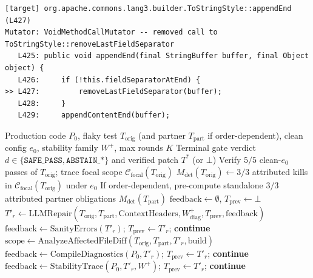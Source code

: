 \begin{lstlisting}[caption={Verbatim differential witness excerpt for Round~1 of \texttt{ToStringBuilderTest} (\texttt{split(",")}, 84/92 killed), exposing the masked trailing-separator fault and guiding Round~2 to \texttt{split(",", -1)} (92/92 killed).},label={lst:witness_example}]
[target] org.apache.commons.lang3.builder.ToStringStyle::appendEnd (L427)
Mutator: VoidMethodCallMutator -- removed call to ToStringStyle::removeLastFieldSeparator
   L425: public void appendEnd(final StringBuffer buffer, final Object object) {
   L426:     if (!this.fieldSeparatorAtEnd) {
>> L427:         removeLastFieldSeparator(buffer);
   L428:     }
   L429:     appendContentEnd(buffer);
\end{lstlisting}

\begin{algorithm}[t]
\caption{\textsc{MuGuard-Flake}: Fail-Closed Mutation-Preserving Flaky Test Repair Loop}
\label{alg:muguard}
\scriptsize
\begin{algorithmic}[1]
\Require Production code $P_0$, flaky test $T_{\text{orig}}$ (and partner $T_{\text{part}}$ if order-dependent), clean config $e_0$, stability family $W^+$, max rounds $K$
\Ensure Terminal gate verdict $d \in \{\texttt{SAFE\_PASS}, \texttt{ABSTAIN\_*}\}$ and verified patch $T^*$ (or $\bot$)
\State Verify $5/5$ clean-$e_0$ passes of $T_{\text{orig}}$; trace focal scope $\mathcal{C}_{\text{focal}}(T_{\text{orig}})$
\State $M_{\text{det}}(T_{\text{orig}}) \gets 3/3$ attributed kills in $\mathcal{C}_{\text{focal}}(T_{\text{orig}})$ under $e_0$
\State If order-dependent, pre-compute standalone $3/3$ attributed partner obligations $M_{\text{det}}(T_{\text{part}})$
\State $\text{feedback} \gets \emptyset$, $T_{\text{prev}} \gets \bot$
    \State $T'_r \gets \text{LLMRepair}(T_{\text{orig}}, T_{\text{part}}, \text{ContextHeaders}, W^+_{\text{diag}}, T_{\text{prev}}, \text{feedback})$
        \State $\text{feedback} \gets \text{SanityErrors}(T'_r)$; $T_{\text{prev}} \gets T'_r$; \textbf{continue}
    \EndIf
    \State $\text{scope} \gets \text{AnalyzeAffectedFileDiff}(T_{\text{orig}}, T_{\text{part}}, T'_r, \text{build})$
        \State $\text{feedback} \gets \text{CompileDiagnostics}(P_0, T'_r)$; $T_{\text{prev}} \gets T'_r$; \textbf{continue}
    \EndIf
     
        \State $\text{feedback} \gets \text{StabilityTrace}(P_0, T'_r, W^+)$; $T_{\text{prev}} \gets T'_r$; \textbf{continue}

\end{algorithmic}
\end{algorithm}
